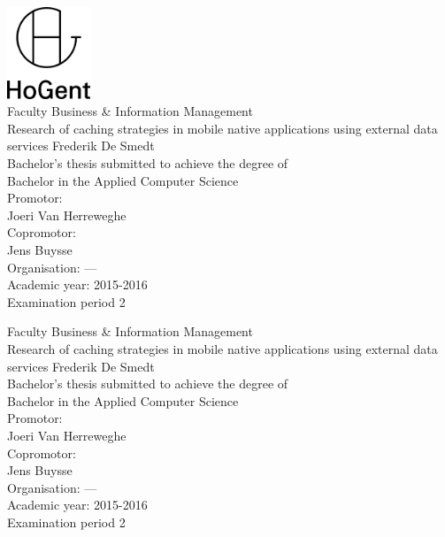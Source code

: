 \documentclass[pdftex,a4paper,12pt,twoside]{report}
\newcommand{\emptypage}{
\newpage
\thispagestyle{empty}
\mbox{}
\newpage
}
\newcommand{\student}{Frederik De Smedt}
\newcommand{\promotor}{Joeri Van Herreweghe}
\newcommand{\copromotor}{Jens Buysse}
\newcommand{\instelling}{---}
\newcommand{\titel}{Research of caching strategies in mobile native applications using external data services}
\newcommand{\faculteit}{Faculty Business \& Information Management}
\newcommand{\rapporttype}{Bachelor's thesis submitted to achieve the degree of\\Bachelor in the Applied Computer Science}
\newcommand{\academiejaar}{2015-2016}
\newcommand{\examenperiode}{Examination period 2}
\begin{document}

\begin{titlepage}
  \begin{center}

    \begingroup
    \rmfamily
    \includegraphics[width=2.5cm]{img/HG-beeldmerk-woordmerk}\\[.5cm]
    \faculteit\\[3cm]
    \titel
    \vfill
    \student\\[3.5cm]
    \rapporttype\\[2cm]
    Promotor:\\
    \promotor\\
    Copromotor:\\
    \copromotor\\[2.5cm]
    Organisation: \instelling\\[.5cm]
    Academic year: \academiejaar\\[.5cm]
    \examenperiode
    \endgroup

  \end{center}
  \restoregeometry
\end{titlepage}


\emptypage


\begin{titlepage}
  \begin{center}

    \begingroup
    \rmfamily
    \faculteit\\[3cm]
    \titel
    \vfill
    \student\\[3.5cm]
    \rapporttype\\[2cm]
    Promotor:\\
    \promotor\\
    Copromotor:\\
    \copromotor\\[2.5cm]
    Organisation: \instelling\\[.5cm]
    Academic year: \academiejaar\\[.5cm]
    \examenperiode
    \endgroup

  \end{center}
  \restoregeometry
\end{titlepage}
\end{document}
